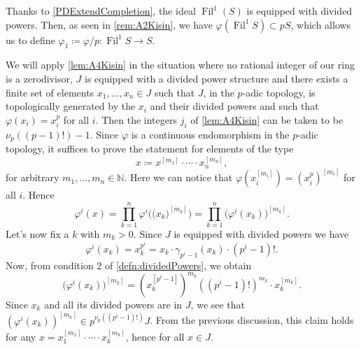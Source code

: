 \begin{ntt}[]\label{not:phi1S}
	Thanks to \cref{PDExtendCompletion}, the ideal 
	$\operatorname{Fil}^1(S)$ is equipped with divided powers.
	Then, as seen in \cref{rem:A2Kisin}, 
	we have $\varphi( \operatorname{Fil}^1 S) \subset p S$, which
	allows us to define $\varphi_1 \coloneqq \varphi/p\colon
	\operatorname{Fil}^1S \to S$.
\end{ntt}


\begin{rem}[]\label{rem:j_iTheoremA6}
	We will apply \cref{lem:A4Kisin} in the situation where no 
	rational integer of our ring is a zerodivisor, $J$ is equipped
	with a divided power structure and there exists a finite set of 
	elements $x_1, \ldots, x_n \in J$ such that $J$, in the $p$-adic topology, 
	is topologically generated by the $x_i$ and their divided powers
	and such that $\varphi(x_i) = x_i^p$ for all $i$.
	Then the integers $j_i$ of \cref{lem:A4Kisin} can
	be taken to be $\nu_p \left( (p-1)! \right) - 1$.
	Since $\varphi$ is a continuous endomorphism in the $p$-adic topology,
	it suffices to prove the statement for elements of the type
	\begin{equation*}
	x \coloneqq x^{[m_1]} \cdot \cdots \cdot x_n^{[m_n]}
	,\end{equation*}
	for arbitrary $m_1, \ldots, m_n \in \mathbb{N}$.
	Here we can notice that $\varphi(x_i^{[m_i]}) = \left( x_i^p \right)^{[m_i]}$
	for all $i$.
	Hence
	\begin{equation*}
		\varphi^i (x) = 
		\prod_{k = 1}^n \varphi^i \Big(\big( x_k \big)^{[m_k]}\Big) =
		\prod_{k = 1}^n 
		\big( \varphi^i(x_k) \big)^{[m_k]}
	.\end{equation*}
	Let's now fix a $k$ with $m_k > 0$.
	Since $J$ is equipped with divided powers we have
	\begin{equation*}
		\varphi^i(x_k) =
		x_k^{p^i} =
		x_k \cdot \gamma_{p^i-1}(x_k) \cdot (p^i-1)!
	.\end{equation*}
	Now, from condition 2 of \cref{defn:dividedPowers}, we obtain
	\begin{equation*}
		\big( \varphi^i(x_k) \big)^{[m_k]} =
		\left( x_k^{[p^i-1]} \right)^{m_k}
		(\left( p^i - 1 \right)!)^{m_k} \cdot x_k^{[m_k]}
	.\end{equation*}
	Since $x_k$ and all its divided powers are in $J$,
	we see that $(\varphi^i(x_k))^{[m_k]} \in p^{\nu_p((p^i-1)!)}J$.
	From the  previous discussion, this claim holds for any 
	$x = x_1^{[m_1]} \cdot \cdots \cdot x_k^{[m_k]}$, hence for all $x \in J$.
\end{rem}


